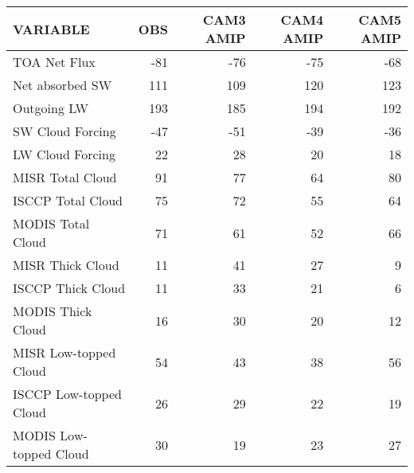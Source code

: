 \begin{tabular}{lrrrr}
\hline
                VARIABLE &                      OBS &                CAM3 AMIP &                CAM4 AMIP &                CAM5 AMIP \\ \hline
            TOA Net Flux &                      -81 &                      -76 &                      -75 &                      -68 \\
         Net absorbed SW &                      111 &                      109 &                      120 &                      123 \\
             Outgoing LW &                      193 &                      185 &                      194 &                      192 \\
        SW Cloud Forcing &                      -47 &                      -51 &                      -39 &                      -36 \\
        LW Cloud Forcing &                       22 &                       28 &                       20 &                       18 \\
        MISR Total Cloud &                       91 &                       77 &                       64 &                       80 \\
       ISCCP Total Cloud &                       75 &                       72 &                       55 &                       64 \\
       MODIS Total Cloud &                       71 &                       61 &                       52 &                       66 \\
        MISR Thick Cloud &                       11 &                       41 &                       27 &                        9 \\
       ISCCP Thick Cloud &                       11 &                       33 &                       21 &                        6 \\
       MODIS Thick Cloud &                       16 &                       30 &                       20 &                       12 \\
   MISR Low-topped Cloud &                       54 &                       43 &                       38 &                       56 \\
  ISCCP Low-topped Cloud &                       26 &                       29 &                       22 &                       19 \\
  MODIS Low-topped Cloud &                       30 &                       19 &                       23 &                       27 \\

\end{tabular}
